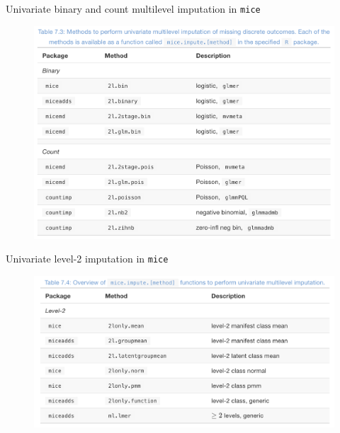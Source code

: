 \documentclass[ignorenonframetext,aspectratio=43]{beamer}
\begin{document}
\begin{frame}{Univariate binary and count multilevel imputation in
\texttt{mice}}

\begin{figure}
\centering
\includegraphics{figures/fig3.png}
\caption{}
\end{figure}

\end{frame}

\begin{frame}{Univariate level-2 imputation in \texttt{mice}}

\begin{figure}
\centering
\includegraphics{figures/fig2.png}
\caption{}
\end{figure}

\end{frame}
\end{document}
